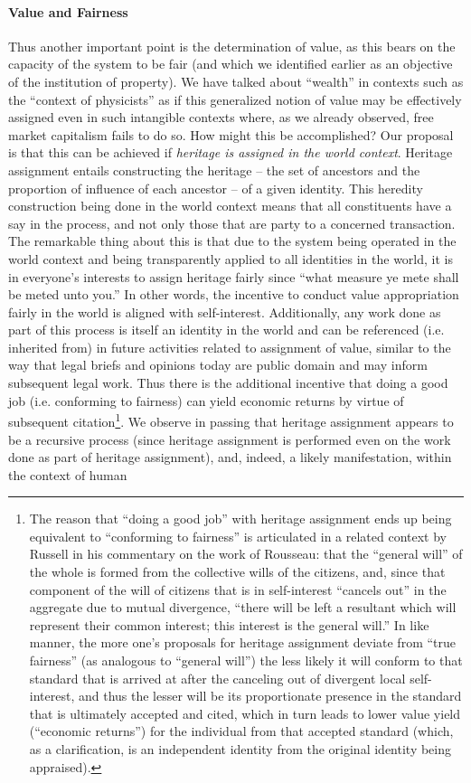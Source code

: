 \documentclass[pra,twocolumn,groupedaddress,10pt]{revtex4}
\theoremstyle{definition}
\begin{document}
\paragraph{Value and Fairness} Thus another important point is the determination of value, as this bears on the capacity of the system to be fair (and which we identified earlier as an objective of the institution of property). We have talked about ``wealth'' in contexts such as the ``context of physicists'' as if this generalized notion of value may be effectively assigned even in such intangible contexts where, as we already observed, free market capitalism fails to do so. How might this be accomplished? Our proposal is that this can be achieved if \textit{heritage is assigned in the world context}. Heritage assignment entails constructing the heritage -- the set of ancestors and the proportion of influence of each ancestor -- of a given identity. This heredity construction being done in the world context means that all constituents have a say in the process, and not only those that are party to a concerned transaction. The remarkable thing about this is that due to the system being operated in the world context and being transparently applied to all identities in the world, it is in everyone's interests to assign heritage fairly since ``what measure ye mete shall be meted unto you.'' In other words, the incentive to conduct value appropriation fairly in the world is aligned with self-interest. Additionally, any work done as part of this process is itself an identity in the world and can be referenced (i.e. inherited from) in future activities related to assignment of value, similar to the way that legal briefs and opinions today are public domain and may inform subsequent legal work. Thus there is the additional incentive that doing a good job (i.e. conforming to fairness) can yield economic returns by virtue of subsequent citation\footnote{The reason that ``doing a good job'' with heritage assignment ends up being equivalent to ``conforming to fairness'' is articulated in a related context by Russell\cite{russell} in his commentary on the work of Rousseau\cite{rousseau}: that the ``general will'' of the whole is formed from the collective wills of the citizens, and, since that component of the will of citizens that is in self-interest ``cancels out'' in the aggregate due to mutual divergence, ``there will be left a resultant which will represent their common interest; this interest is the general will.'' In like manner, the more one's proposals for heritage assignment deviate from ``true fairness'' (as analogous to ``general will'') the less likely it will conform to that standard that is arrived at after the canceling out of divergent local self-interest, and thus the lesser will be its proportionate presence in the standard that is ultimately accepted and cited, which in turn leads to lower value yield (``economic returns'') for the individual from that accepted standard (which, as a clarification, is an independent identity from the original identity being appraised).}. We observe in passing that heritage assignment appears to be a recursive process (since heritage assignment is performed even on the work done as part of heritage assignment), and, indeed, a likely manifestation, within the context of human 
\end{document}
